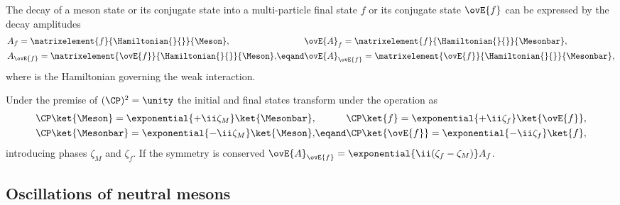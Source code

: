 The decay of a meson state \Meson or its \CP conjugate state \Mesonbar into a
multi-particle final state $f$ or its \CP conjugate state $\ovE{f}$ can be
expressed by the decay amplitudes
%
\begin{equation}
  \begin{alignedat}{2}
    & A_f         = \matrixelement{f}{\Hamiltonian{}{}}{\Meson},       && \ovE{A}_f         = \matrixelement{f}{\Hamiltonian{}{}}{\Mesonbar}, \\
    & A_{\ovE{f}} = \matrixelement{\ovE{f}}{\Hamiltonian{}{}}{\Meson}, &\eqand& \ovE{A}_{\ovE{f}} = \matrixelement{\ovE{f}}{\Hamiltonian{}{}}{\Mesonbar},
  \end{alignedat}
\end{equation}
%
where \Hamiltonian{}{} is the Hamiltonian governing the weak interaction.

Under the premise of $(\CP)^2 = \unity$ the initial and final states transform under
the \CP operation as
%
\begin{equation}
  \begin{alignedat}{2}
    & \CP\ket{\Meson}    = \exponential{+\ii\zeta_{M}} \ket{\Mesonbar}, && \CP \ket{f}        = \exponential{+\ii\zeta_{f}} \ket{\ovE{f}}, \\
    & \CP\ket{\Mesonbar} = \exponential{-\ii\zeta_{M}} \ket{\Meson}   , &\eqand& \CP \ket{\ovE{f}}  = \exponential{-\ii\zeta_{f}} \ket{f},
  \end{alignedat}
\end{equation}
%
introducing phases $\zeta_M$ and $\zeta_f$. If the \CP symmetry is conserved
$\ovE{A}_{\ovE{f}} = \exponential{\ii(\zeta_f - \zeta_M)} A_f$.

\subsection[
  head={Oscillations of neutral \B mesons},
  tocentry={Oscillations of neutral \BHyperref mesons}
]{Oscillations of neutral \Bbfsf mesons}
\label{sec:cpv_theory:flavour_physics:bmixing}

